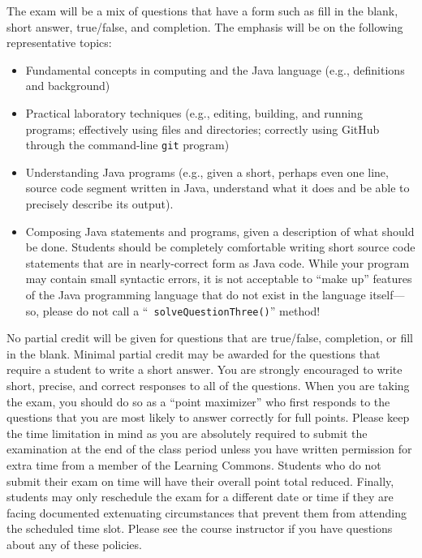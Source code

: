 \documentclass[11pt]{article}
\begin{document}
\noindent The exam will be a mix of questions that have a form such as fill in
the blank, short answer, true/false, and completion. The emphasis will be on the
following representative topics:

\vspace*{-.05in}
\begin{itemize}

  \itemsep 0in

  \item Fundamental concepts in computing and the Java language (e.g.,
    definitions and background)

  \item Practical laboratory techniques (e.g., editing, building, and running
    programs; effectively using files and directories; correctly using GitHub
    through the command-line {\tt git} program)

  \item Understanding Java programs (e.g., given a short, perhaps even one line,
    source code segment written in Java, understand what it does and be able to
    precisely describe its output).

  \item Composing Java statements and programs, given a description of what
    should be done. Students should be completely comfortable writing short
    source code statements that are in nearly-correct form as Java code. While
    your program may contain small syntactic errors, it is not acceptable to
    ``make up'' features of the Java programming language that do not exist in
    the language itself---so, please do not call a ``{\tt
    solveQuestionThree()}'' method!

\end{itemize}

\noindent No partial credit will be given for questions that are true/false,
completion, or fill in the blank. Minimal partial credit may be awarded for the
questions that require a student to write a short answer. You are strongly
encouraged to write short, precise, and correct responses to all of the
questions. When you are taking the exam, you should do so as a ``point
maximizer'' who first responds to the questions that you are most likely to
answer correctly for full points. Please keep the time limitation in mind as you
are absolutely required to submit the examination at the end of the class period
unless you have written permission for extra time from a member of the Learning
Commons. Students who do not submit their exam on time will have their overall
point total reduced. Finally, students may only reschedule the exam for a
different date or time if they are facing documented extenuating circumstances
that prevent them from attending the scheduled time slot. Please see the course
instructor if you have questions about any of these policies.
\end{document}
